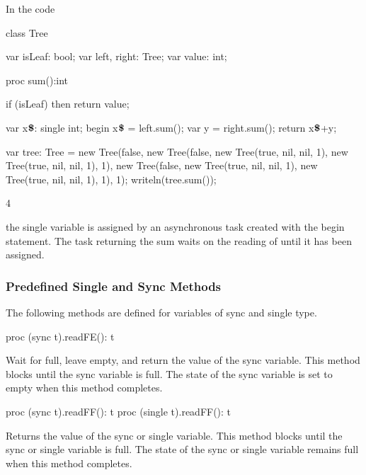 \begin{example}
In the code
\begin{chapelpre}
\end{chapelpre}
\begin{chapel}
class Tree {
  var isLeaf: bool;
  var left, right: Tree;
  var value: int;

  proc sum():int {
    if (isLeaf) then 
       return value;

    var x$\mbox{{\bf \$}}$: single int;
    begin x$\mbox{{\bf \$}}$ = left.sum();
    var y = right.sum();
    return x$\mbox{{\bf \$}}$+y;
  }
}
\end{chapel}
\begin{chapelpost}
var tree: Tree = new Tree(false, new Tree(false, new Tree(true, nil, nil, 1),
                                                 new Tree(true, nil, nil, 1), 1),
                                 new Tree(false, new Tree(true, nil, nil, 1),
                                                 new Tree(true, nil, nil, 1), 1), 1);
writeln(tree.sum());
\end{chapelpost}
\begin{chapeloutput}
4
\end{chapeloutput}
the single variable  is assigned by an
asynchronous task created with the begin statement.  The task
returning the sum waits on the reading of 
until it has been assigned.
\end{example}

\subsubsection{Predefined Single and Sync Methods}
\label{Functions_on_Synchronization_Variables}

The following methods are defined for variables of sync and single
type.

\begin{protohead}
proc (sync t).readFE(): t
\end{protohead}
\begin{protobody}
Wait for full, leave empty, and return the value of the sync variable.
This method blocks until the sync variable is full.  The state of the
sync variable is set to empty when this method completes.
\end{protobody}

\begin{protohead}
proc (sync t).readFF(): t
proc (single t).readFF(): t
\end{protohead}
\begin{protobody}
Returns the value of the sync or single variable.  This method blocks
until the sync or single variable is full.  The state of the sync or
single variable remains full when this method completes.
\end{protobody}

